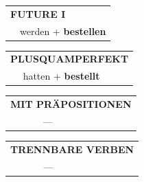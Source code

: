 \documentclass[10pt,a4paper]{revtex4-2}
\begin{document}
\begin{verbbox-acc}
\begin{tabular}{rl}
    \multicolumn{2}{l}{\textbf{FUTURE I} }\\
   & werden + \textbf{bestellen}\\
 
  \end{tabular}
\hfill
   \begin{tabular}{rl}
      \multicolumn{2}{l}{\textbf{PLUSQUAMPERFEKT}}\\
   & hatten + \textbf{bestellt}\\
  \end{tabular}
  
 \vspace{10pt}

\begin{tabular}{lll}
\multicolumn{3}{l}{\textbf{MIT PRÄPOSITIONEN}}\\
& ---\\
\end{tabular}
\hfill
\begin{tabular}{lll}
\multicolumn{3}{l}{\textbf{TRENNBARE VERBEN}}\\
& ---\\
\end{tabular}

\vspace{-5pt}


\end{verbbox-acc}
\end{document}
